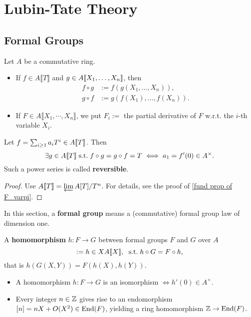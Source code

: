 \section{Lubin-Tate Theory}

\subsection{Formal Groups}
Let $A$ be a commutative ring.
\begin{itemize}
    \item If $f\in A\llbracket T\rrbracket$ and $g\in A\llbracket X_1, \dots, X_n \rrbracket$, then \begin{align*}
        f \circ g &:= f(g(X_1, \dots, X_n)),\\
        g\circ f &:= g(f(X_1), \dots, f(X_n)).
    \end{align*}
    \item If $F\in A\llbracket X_1, \cdots, X_n  \rrbracket$, we put $F_i := $ the partial derivative of $F$ w.r.t.\! the $i$-th variable $X_i$.    
\end{itemize}
\begin{lemma}\label{power series reversible iff}
    Let $f = \sum_{i\ge 1}a_iT^i\in A\llbracket T \rrbracket$. Then
    \[\exists g\in A\llbracket T \rrbracket \;\mathrm{s.t.}\; f\circ g = g\circ f = T\iff a_1 = f'(0)\in A^\times.\]
    Such a power series is called \textbf{reversible}.
\end{lemma}
\begin{proof}
    Use $A\llbracket T \rrbracket = \varprojlim A[T]/T^n$. For details, see the proof of \cref{fund prop of F_varpi}.
\end{proof}


In this section, a \textbf{formal group} means a (commutative) formal group law of dimension one.

A \textbf{homomorphism} $h : F\to G$ between formal groups $F$ and $G$ over $A$
\[:= h\in XA\llbracket X \rrbracket,\ \;\mathrm{s.t.}\; h\circ G = F\circ h,\]
that is $h(G(X, Y)) = F(h(X), h(Y))$.
\begin{itemize}
    \item A homomorphism $h : F\to G$ is an isomorphism $\iff h'(0)\in A^\times$.
    \item Every integer $n\in\mathbb{Z}$ gives rise to an endomorphism $[n] = nX + O(X^2) \in \operatorname{End}(F)$,
    yielding a ring homomorphism $\mathbb{Z}\to\operatorname{End}(F)$.
\end{itemize}

